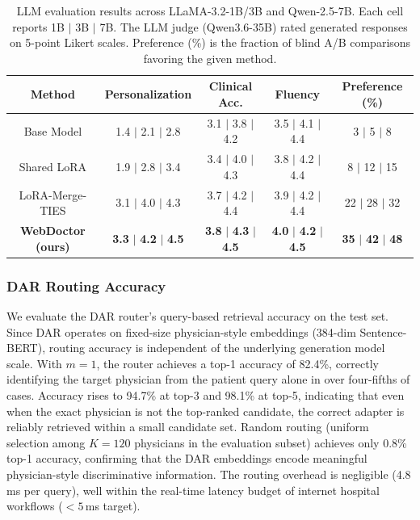 \begin{table}[!t]
\small
\setlength{\tabcolsep}{4pt}
\renewcommand\arraystretch{1.06}
\centering
\caption{LLM evaluation results across LLaMA-3.2-1B/3B and Qwen-2.5-7B. Each cell reports 1B $|$ 3B $|$ 7B. The LLM judge (Qwen3.6-35B) rated generated responses on 5-point Likert scales. Preference (\%) is the fraction of blind A/B comparisons favoring the given method.}
\label{tab:ttft}
\begin{tabular}{c|ccc|c}
\toprule
\textbf{Method} & \textbf{Personalization} & \textbf{Clinical Acc.} & \textbf{Fluency} & \textbf{Preference} (\%)\\
\midrule
Base Model & 1.4 $|$ 2.1 $|$ 2.8 & 3.1 $|$ 3.8 $|$ 4.2 & 3.5 $|$ 4.1 $|$ 4.4 & 3 $|$ 5 $|$ 8\\
Shared LoRA & 1.9 $|$ 2.8 $|$ 3.4 & 3.4 $|$ 4.0 $|$ 4.3 & 3.8 $|$ 4.2 $|$ 4.4 & 8 $|$ 12 $|$ 15\\
LoRA-Merge-TIES & 3.1 $|$ 4.0 $|$ 4.3 & 3.7 $|$ 4.2 $|$ 4.4 & 3.9 $|$ 4.2 $|$ 4.4 & 22 $|$ 28 $|$ 32\\
\midrule
\rowcolor{blue!5}
\textbf{WebDoctor (ours)} & \textbf{3.3} $|$ \textbf{4.2} $|$ \textbf{4.5} & \textbf{3.8} $|$ \textbf{4.3} $|$ \textbf{4.5} & \textbf{4.0} $|$ \textbf{4.2} $|$ \textbf{4.5} & \textbf{35} $|$ \textbf{42} $|$ \textbf{48}\\
\bottomrule
\end{tabular}
\end{table}

\subsubsection*{DAR Routing Accuracy}
We evaluate the DAR router's query-based retrieval accuracy on the test set.
Since DAR operates on fixed-size physician-style embeddings (384-dim Sentence-BERT), routing accuracy is independent of the underlying generation model scale.
With $m=1$, the router achieves a top-1 accuracy of 82.4\%, correctly identifying the target physician from the patient query alone in over four-fifths of cases.
Accuracy rises to 94.7\% at top-3 and 98.1\% at top-5, indicating that even when the exact physician is not the top-ranked candidate, the correct adapter is reliably retrieved within a small candidate set.
Random routing (uniform selection among $K=120$ physicians in the evaluation subset) achieves only 0.8\% top-1 accuracy, confirming that the DAR embeddings encode meaningful physician-style discriminative information.
The routing overhead is negligible (4.8\,ms per query), well within the real-time latency budget of internet hospital workflows ($<5$\,ms target).


